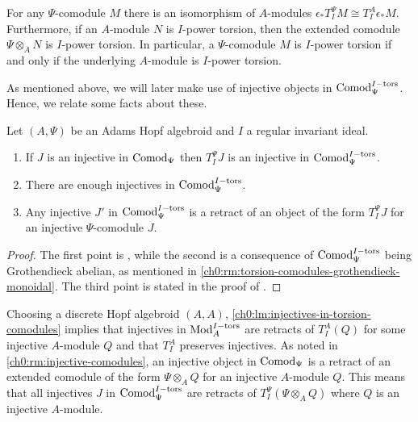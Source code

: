 \begin{lemma}
    \label{ch0:lm:torsion-comodule-iff-torsion-module}
    For any $\Psi$-comodule $M$ there is an isomorphism of $A$-modules $\epsilon_* T^\Psi_I M \cong T^A_I \epsilon_* M.$
    Furthermore, if an $A$-module $N$ is $I$-power torsion, then the extended comodule $\Psi\otimes_A N$ is $I$-power torsion. In particular, a $\Psi$-comodule $M$ is $I$-power torsion if and only if the underlying $A$-module is $I$-power torsion. 
\end{lemma}

As mentioned above, we will later make use of injective objects in $\mathrm{Comod}_\Psi^{I-\mathrm{tors}}$. Hence, we relate some facts about these. 

\begin{lemma}
    \label{ch0:lm:injectives-in-torsion-comodules}
    Let $(A, \Psi)$ be an Adams Hopf algebroid and $I$ a regular invariant ideal.
    \begin{enumerate}
        \item If $J$ is an injective in $\mathrm{Comod}_\Psi$ then $T_I^\Psi J$ is an injective in $\mathrm{Comod}_\Psi^{I-\mathrm{tors}}$.
        \item There are enough injectives in $\mathrm{Comod}_\Psi^{I-\mathrm{tors}}$.
        \item Any injective $J'$ in $\mathrm{Comod}_\Psi^{I-\mathrm{tors}}$ is a retract of an object of the form $T_I^\Psi J$ for an injective $\Psi$-comodule $J$.
    \end{enumerate} 
\end{lemma}
\begin{proof}
    The first point is \cite[2.1.4]{brodmann-sharp_1998}, while the second is a consequence of $\mathrm{Comod}_\Psi^{I-\mathrm{tors}}$ being Grothendieck abelian, as mentioned in \cref{ch0:rm:torsion-comodules-grothendieck-monoidal}. The third point is stated in the proof of \cite[3.16]{barthel-heard-valenzuela_2020}. 
\end{proof}

\begin{remark}
    \label{ch0:rm:injectives-in-torsion-modules}
    Choosing a discrete Hopf algebroid $(A,A)$, \cref{ch0:lm:injectives-in-torsion-comodules} implies that injectives in $\mathrm{Mod}_A^{I-\mathrm{tors}}$ are retracts of $T_I^A(Q)$ for some injective $A$-module $Q$ and that $T_I^A$ preserves injectives. As noted in \cref{ch0:rm:injective-comodules}, an injective object in $\mathrm{Comod}_\Psi$ is a retract of an extended comodule of the form $\Psi\otimes_A Q$ for an injective $A$-module $Q$. This means that all injectives $J$ in $\mathrm{Comod}_\Psi^{I-\mathrm{tors}}$ are retracts of $T_I^\Psi(\Psi\otimes_A Q)$ where $Q$ is an injective $A$-module. 
\end{remark}

